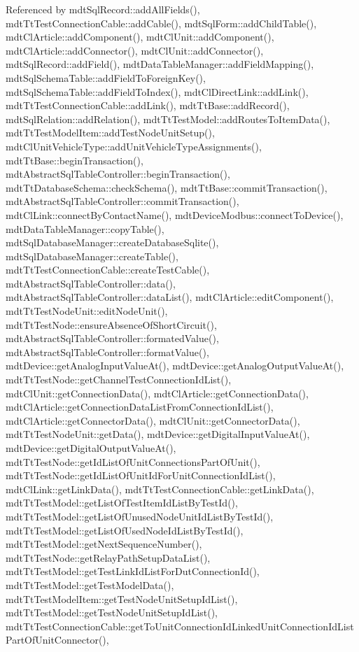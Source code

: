 Referenced by mdt\-Sql\-Record\-::add\-All\-Fields(), mdt\-Tt\-Test\-Connection\-Cable\-::add\-Cable(), mdt\-Sql\-Form\-::add\-Child\-Table(), mdt\-Cl\-Article\-::add\-Component(), mdt\-Cl\-Unit\-::add\-Component(), mdt\-Cl\-Article\-::add\-Connector(), mdt\-Cl\-Unit\-::add\-Connector(), mdt\-Sql\-Record\-::add\-Field(), mdt\-Data\-Table\-Manager\-::add\-Field\-Mapping(), mdt\-Sql\-Schema\-Table\-::add\-Field\-To\-Foreign\-Key(), mdt\-Sql\-Schema\-Table\-::add\-Field\-To\-Index(), mdt\-Cl\-Direct\-Link\-::add\-Link(), mdt\-Tt\-Test\-Connection\-Cable\-::add\-Link(), mdt\-Tt\-Base\-::add\-Record(), mdt\-Sql\-Relation\-::add\-Relation(), mdt\-Tt\-Test\-Model\-::add\-Routes\-To\-Item\-Data(), mdt\-Tt\-Test\-Model\-Item\-::add\-Test\-Node\-Unit\-Setup(), mdt\-Cl\-Unit\-Vehicle\-Type\-::add\-Unit\-Vehicle\-Type\-Assignments(), mdt\-Tt\-Base\-::begin\-Transaction(), mdt\-Abstract\-Sql\-Table\-Controller\-::begin\-Transaction(), mdt\-Tt\-Database\-Schema\-::check\-Schema(), mdt\-Tt\-Base\-::commit\-Transaction(), mdt\-Abstract\-Sql\-Table\-Controller\-::commit\-Transaction(), mdt\-Cl\-Link\-::connect\-By\-Contact\-Name(), mdt\-Device\-Modbus\-::connect\-To\-Device(), mdt\-Data\-Table\-Manager\-::copy\-Table(), mdt\-Sql\-Database\-Manager\-::create\-Database\-Sqlite(), mdt\-Sql\-Database\-Manager\-::create\-Table(), mdt\-Tt\-Test\-Connection\-Cable\-::create\-Test\-Cable(), mdt\-Abstract\-Sql\-Table\-Controller\-::data(), mdt\-Abstract\-Sql\-Table\-Controller\-::data\-List(), mdt\-Cl\-Article\-::edit\-Component(), mdt\-Tt\-Test\-Node\-Unit\-::edit\-Node\-Unit(), mdt\-Tt\-Test\-Node\-::ensure\-Absence\-Of\-Short\-Circuit(), mdt\-Abstract\-Sql\-Table\-Controller\-::formated\-Value(), mdt\-Abstract\-Sql\-Table\-Controller\-::format\-Value(), mdt\-Device\-::get\-Analog\-Input\-Value\-At(), mdt\-Device\-::get\-Analog\-Output\-Value\-At(), mdt\-Tt\-Test\-Node\-::get\-Channel\-Test\-Connection\-Id\-List(), mdt\-Cl\-Unit\-::get\-Connection\-Data(), mdt\-Cl\-Article\-::get\-Connection\-Data(), mdt\-Cl\-Article\-::get\-Connection\-Data\-List\-From\-Connection\-Id\-List(), mdt\-Cl\-Article\-::get\-Connector\-Data(), mdt\-Cl\-Unit\-::get\-Connector\-Data(), mdt\-Tt\-Test\-Node\-Unit\-::get\-Data(), mdt\-Device\-::get\-Digital\-Input\-Value\-At(), mdt\-Device\-::get\-Digital\-Output\-Value\-At(), mdt\-Tt\-Test\-Node\-::get\-Id\-List\-Of\-Unit\-Connections\-Part\-Of\-Unit(), mdt\-Tt\-Test\-Node\-::get\-Id\-List\-Of\-Unit\-Id\-For\-Unit\-Connection\-Id\-List(), mdt\-Cl\-Link\-::get\-Link\-Data(), mdt\-Tt\-Test\-Connection\-Cable\-::get\-Link\-Data(), mdt\-Tt\-Test\-Model\-::get\-List\-Of\-Test\-Item\-Id\-List\-By\-Test\-Id(), mdt\-Tt\-Test\-Model\-::get\-List\-Of\-Unused\-Node\-Unit\-Id\-List\-By\-Test\-Id(), mdt\-Tt\-Test\-Model\-::get\-List\-Of\-Used\-Node\-Id\-List\-By\-Test\-Id(), mdt\-Tt\-Test\-Model\-::get\-Next\-Sequence\-Number(), mdt\-Tt\-Test\-Node\-::get\-Relay\-Path\-Setup\-Data\-List(), mdt\-Tt\-Test\-Model\-::get\-Test\-Link\-Id\-List\-For\-Dut\-Connection\-Id(), mdt\-Tt\-Test\-Model\-::get\-Test\-Model\-Data(), mdt\-Tt\-Test\-Model\-Item\-::get\-Test\-Node\-Unit\-Setup\-Id\-List(), mdt\-Tt\-Test\-Model\-::get\-Test\-Node\-Unit\-Setup\-Id\-List(), mdt\-Tt\-Test\-Connection\-Cable\-::get\-To\-Unit\-Connection\-Id\-Linked\-Unit\-Connection\-Id\-List\-Part\-Of\-Unit\-Connector(), 